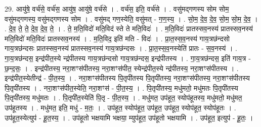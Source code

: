 \documentclass[17pt]{extarticle}
\begin{document}
29. आयु॑षे॒ वर्च॑से॒ वर्च॑स॒ आयु॑ष॒ आयु॑षे॒ वर्च॑से । . वर्च॑स॒ इति॒ वर्च॑से । . वसु॑मद्‍गणस्य सोम सोम॒ वसु॑मद्‍गणस्य॒ वसु॑मद्‍गणस्य सोम । . वसु॑मद् गण॒स्येति॒ वसु॑मत् - ग॒ण॒स्य॒ । . सो॒म॒ दे॒व॒ दे॒व॒ सो॒म॒ सो॒म॒ दे॒व॒ । . दे॒व॒ ते॒ ते॒ दे॒व॒ दे॒व॒ ते॒ । . ते॒ म॒ति॒विदो॑ मति॒विद॑ स्ते ते मति॒विदः॑ । . म॒ति॒विदः॑ प्रातस्सव॒नस्य॑ प्रातस्सव॒नस्य॑ मति॒विदो॑ मति॒विदः॑ प्रातस्सव॒नस्य॑ । . म॒ति॒विद॒ इति॑ मति - विदः॑ । . प्रा॒त॒स्स॒व॒नस्य॑ गाय॒त्रछ॑न्दसो गाय॒त्रछ॑न्दसः प्रातस्सव॒नस्य॑ प्रातस्सव॒नस्य॑ गाय॒त्रछ॑न्दसः । . प्रा॒त॒स्स॒व॒नस्येति॑ प्रातः - स॒व॒नस्य॑ । . गा॒य॒त्रछ॑न्दस॒ इन्द्र॑पीत॒स्ये न्द्र॑पीतस्य गाय॒त्रछ॑न्दसो गाय॒त्रछ॑न्दस॒ इन्द्र॑पीतस्य । . गा॒य॒त्रछ॑न्दस॒ इति॑ गाय॒त्र - छ॒न्द॒सः॒ । . इन्द्र॑पीतस्य॒ नरा॒शꣳस॑पीतस्य॒ नरा॒शꣳस॑पीत॒ स्येन्द्र॑पीत॒स्ये न्द्र॑पीतस्य॒ नरा॒शꣳस॑पीतस्य । . इन्द्र॑पीत॒स्येतीन्द्र॑ - पी॒त॒स्य॒ । . नरा॒शꣳस॑पीतस्य पि॒तृपी॑तस्य पि॒तृपी॑तस्य॒ नरा॒शꣳस॑पीतस्य॒ नरा॒शꣳस॑पीतस्य पि॒तृपी॑तस्य । . नरा॒शꣳस॑पीत॒स्येति॒ नरा॒शꣳस॑ - पी॒त॒स्य॒ । . पि॒तृपी॑तस्य॒ मधु॑मतो॒ मधु॑मतः पि॒तृपी॑तस्य पि॒तृपी॑तस्य॒ मधु॑मतः । . पि॒तृपी॑त॒स्येति॑ पि॒तृ - पी॒त॒स्य॒ । . मधु॑मत॒ उप॑हूत॒ स्योप॑हूतस्य॒ मधु॑मतो॒ मधु॑मत॒ उप॑हूतस्य । . मधु॑मत॒ इति॒ मधु॑ - म॒तः॒ । . उप॑हूत॒ स्योप॑हूत॒ उप॑हूत॒ उप॑हूत॒ स्योप॑हूत॒ स्योप॑हूतः । . उप॑हूत॒स्येत्युप॑ - हू॒त॒स्य॒ । . उप॑हूतो भक्षयामि भक्षया॒ म्युप॑हूत॒ उप॑हूतो भक्षयामि । . उप॑हूत॒ इत्युप॑ - हू॒तः॒ । \newline
\end{document}
